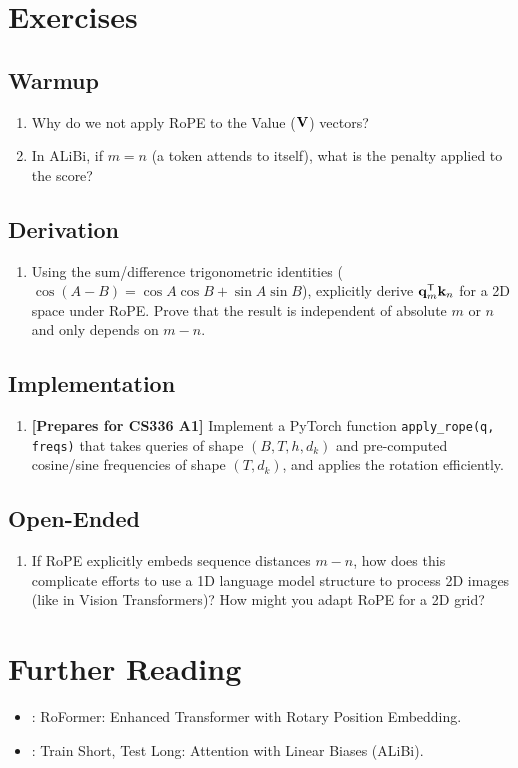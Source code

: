 \section{Exercises}
\label{ch:11:sec:exercises}

\subsection*{Warmup}
\begin{enumerate}
  \item Why do we not apply RoPE to the Value ($\mathbf{V}$) vectors?
  \item In ALiBi, if $m=n$ (a token attends to itself), what is the penalty applied to the score?
\end{enumerate}

\subsection*{Derivation}
\begin{enumerate}
  \item Using the sum/difference trigonometric identities ($\cos(A-B) = \cos A \cos B + \sin A \sin B$), explicitly derive $\mathbf{q}_m^{\mathsf{T}} \mathbf{k}_n$ for a 2D space under RoPE. Prove that the result is independent of absolute $m$ or $n$ and only depends on $m-n$.
\end{enumerate}

\subsection*{Implementation}
\begin{enumerate}
  \item \textbf{[Prepares for CS336 A1]} Implement a PyTorch function \texttt{apply\_rope(q, freqs)} that takes queries of shape $(B, T, h, d_k)$ and pre-computed cosine/sine frequencies of shape $(T, d_k)$, and applies the rotation efficiently.
\end{enumerate}

\subsection*{Open-Ended}
\begin{enumerate}
  \item If RoPE explicitly embeds sequence distances $m-n$, how does this complicate efforts to use a 1D language model structure to process 2D images (like in Vision Transformers)? How might you adapt RoPE for a 2D grid?
\end{enumerate}

\section{Further Reading}
\label{ch:11:sec:further}

\begin{itemize}
  \item \textcite{su2021}: RoFormer: Enhanced Transformer with Rotary Position Embedding.
  \item \textcite{press2021}: Train Short, Test Long: Attention with Linear Biases (ALiBi).
\end{itemize}
